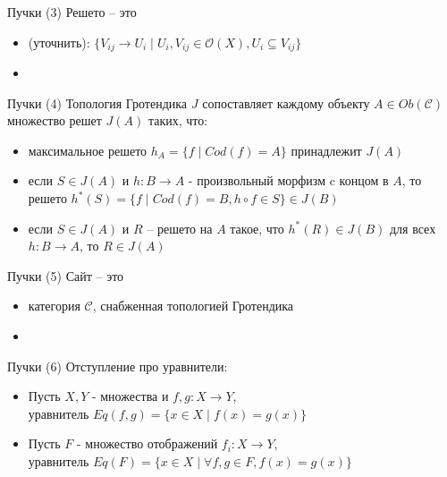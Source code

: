 \documentclass{beamer}
\begin{document}
\begin{frame}{Пучки (3)}
Решето -- это\\
\medskip
\begin{small}
\begin{itemize}
	\item (уточнить): $\{ V_{ij} \to U_i \; \vert \; U_i, V_{ij} \in \mathcal{O}(X), U_i \subseteq V_{ij} \}$
	\item 
\end{itemize}
\end{small}
\end{frame}

\begin{frame}{Пучки (4)}
Топология Гротендика $J$ сопоставляет каждому объекту $A \in Ob(\mathcal{C})$ множество решет $J(A)$ таких, что:\\
\medskip
\begin{small}
\begin{itemize}
	\item максимальное решето $h_A = \{ f \; \vert \; Cod(f) = A \}$ принадлежит $J(A)$
	\item если $S \in J(A)$ и $h : B \to A$ - произвольный морфизм c концом в $A$, то решето $h^*(S) = \{ f \; \vert \; Cod(f) = B, h \circ f \in S \} \in J(B)$
	\item если $S \in J(A)$ и $R$ -- решето на $A$ такое, что $h^*(R) \in J(B)$ для всех $h : B \to A$, то $R \in J(A)$
\end{itemize}
\end{small}
\end{frame}

\begin{frame}{Пучки (5)}
Сайт -- это\\
\medskip
\begin{small}
\begin{itemize}
	\item категория $\mathcal{C}$, снабженная топологией Гротендика
	\item 
\end{itemize}
\end{small}
\end{frame}

\begin{frame}{Пучки (6)}
Отступление про уравнители:\\
\medskip
\begin{small}
\begin{itemize}
	\item Пусть $X, Y$ - множества и $f, g : X \to Y$, \\уравнитель $Eq(f,g) = \{ x \in X \; \vert \; f(x) = g(x) \}$
	\medskip
	\item Пусть $F$ - множество отображений $f_i : X \to Y$, \\уравнитель $Eq(F) = \{ x \in X \; \vert \; \forall f, g \in F, f(x) = g(x) \}$
\end{itemize}
\end{small}
\end{frame}
\end{document}
